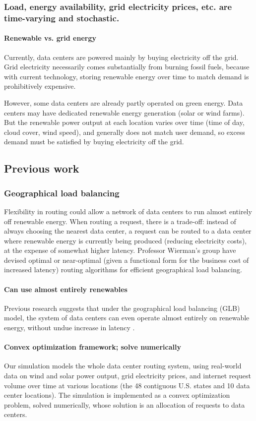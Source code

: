 \documentclass{acm_proc_article-sp}
\begin{document}
	\subsubsection{Load, energy availability, grid electricity prices, etc. are time-varying and stochastic.}
		\paragraph{Renewable vs. grid energy}
			Currently, data centers are powered mainly by buying electricity off the grid. Grid electricity necessarily comes substantially from burning fossil fuels, because with current technology, storing renewable energy over time to match demand is prohibitively expensive.
			
			However, some data centers are already partly operated on green energy. Data centers may have dedicated renewable energy generation (solar or wind farms). But the renewable power output at each location varies over time (time of day, cloud cover, wind speed), and generally does not match user demand, so excess demand must be satisfied by buying electricity off the grid.


\subsection{Previous work}
	\subsubsection{Geographical load balancing}
		Flexibility in routing could allow a network of data centers to run almost entirely off renewable energy. When routing a request, there is a trade-off: instead of always choosing the nearest data center, a request can be routed to a data center where renewable energy is currently being produced (reducing electricity costs), at the expense of somewhat higher latency. Professor Wierman’s group have devised optimal or near-optimal (given a functional form for the business cost of increased latency) routing algorithms for efficient geographical load balancing.
		\paragraph{Can use almost entirely renewables}
			Previous research suggests that under the geographical load balancing (GLB) model, the system of data centers can even operate almost entirely on renewable energy, without undue increase in latency \cite{adam:GLB}.
		\paragraph{Convex optimization framework; solve numerically}
			Our simulation models the whole data center routing system, using real-world data on wind and solar power output, grid electricity prices, and internet request volume over time at various locations (the 48 contiguous U.S. states and 10 data center locations). The simulation is implemented as a convex optimization problem, solved numerically, whose solution is an allocation of requests to data centers.
		
\end{document}
